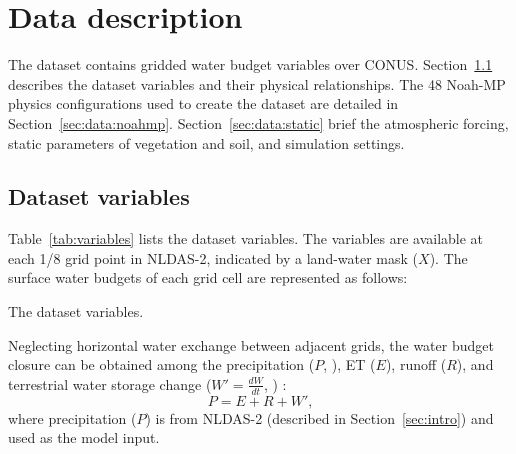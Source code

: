 \documentclass[essd, manuscript]{copernicus}
\let\unit\undefined
\begin{document}
\section{Data description}\label{sec:data}

The dataset contains gridded water budget variables over CONUS\@. Section~\ref{sec:data:variables} describes the dataset variables and their physical relationships. The 48 Noah-MP physics configurations used to create the dataset are detailed in Section~\ref{sec:data:noahmp}. Section~\ref{sec:data:static} brief the atmospheric forcing, static parameters of vegetation and soil, and simulation settings.

\subsection{Dataset variables}\label{sec:data:variables}

Table~\ref{tab:variables} lists the dataset variables. The variables are available at each 1/8\degree{} grid point in NLDAS-2, indicated by a land-water mask (\(X\)). The surface water budgets of each grid cell are represented as follows:

\begin{table}[t]
  \caption{The dataset variables.}
  \label{tab:variables}
  
\end{table}

Neglecting horizontal water exchange between adjacent grids, the water budget closure can be obtained among the precipitation (\(P\), \unit{kg.m^{-2}.s^{-1}}), ET (\(E\)), runoff (\(R\)), and terrestrial water storage change (\(W'=\frac{dW}{dt}\), \unit{kg.m^{-2}.s^{-1}}) \citep{zheng2020JAMES}:
\begin{equation}
  P = E + R + W'
  \text{,}
\end{equation}
where precipitation (\(P\)) is from NLDAS-2 (described in Section~\ref{sec:intro}) and used as the model input.
\end{document}
